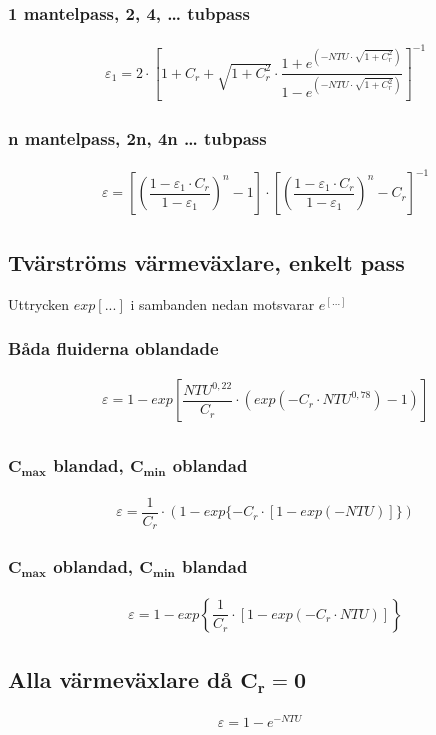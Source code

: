 	\subsubsection*{1 mantelpass, 2, 4, … tubpass}
	\begin{align*}
		& \varepsilon_1 = 2 \cdot \left[ 1 + C_r + \sqrt{1+C_r^2} \cdot \dfrac{1+e^{(-NTU \cdot \sqrt{1+C_r^2})}}{1-e^{(-NTU \cdot \sqrt{1+C_r^2})}}\right]^{-1}
	\end{align*}
	\subsubsection*{n mantelpass, 2n, 4n … tubpass}
	\begin{align*}
		& \varepsilon = \left[ \left(\dfrac{1- \varepsilon_1 \cdot C_r}{1 - \varepsilon_1} \right)^n - 1\right] \cdot \left[ \left(\dfrac{1- \varepsilon_1 \cdot C_r}{1 - \varepsilon_1} \right)^n - C_r\right]^{-1}
	\end{align*}
	\subsection*{Tvärströms värmeväxlare, enkelt pass}
	Uttrycken $exp[...]$ i sambanden nedan motsvarar $e^{[...]}$
	\subsubsection*{Båda fluiderna oblandade}
	\begin{align*}
		& \varepsilon = 1 - exp\left[{\dfrac{NTU^{0,22}}{C_r} \cdot \left(exp{(-C_r \cdot NTU^{0,78})} -1 \right)}\right] \\
	\end{align*}
	\subsubsection*{$\mathbf{C_{max}}$ blandad, $\mathbf{C_{min}}$ oblandad}
	\begin{align*}
	& \varepsilon = \dfrac{1}{C_r} \cdot ( 1- exp\{ -C_r \cdot [1 - exp(-NTU)]\})
	\end{align*}
	\subsubsection*{$\mathbf{C_{max}}$ oblandad, $\mathbf{C_{min}}$ blandad}
	\begin{align*}
	& \varepsilon = 1- exp\left\{ \dfrac{1}{C_r} \cdot [1 - exp(-C_r \cdot NTU)]\right\}
	\end{align*}
	\subsection*{Alla värmeväxlare då $\mathbf{C_r = 0}$}
	\begin{align*}
		\varepsilon = 1 - e^{-NTU}
	\end{align*}

